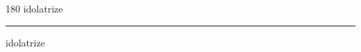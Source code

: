 
\begin{frame}
\begin{center}
\begin{turn}{180}
{\fontsize{2.5cm}{1em}\selectfont idolatrize}
\end{turn}
\vspace{1em}\par  
\hrule
\vspace{1em}\par  
{\fontsize{2.5cm}{1em}\selectfont idolatrize}
\end{center}
\end{frame}
